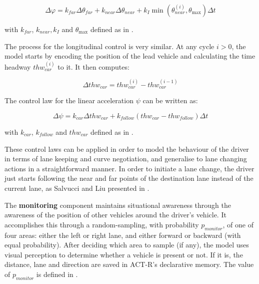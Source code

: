 \begin{equation}
	\Delta \varphi = k_{far} \Delta \theta_{far} + k_{near} \Delta \theta_{near} + k_I \min{(\theta_{near}^{(i)}, \theta_{\max})} \Delta t
\end{equation}

with $k_{far}$, $k_{near},k_{I}$ and $\theta_{\max}$ defined as in \cite{salvucci_1}.

The process for the longitudinal control is very similar. At any cycle $i > 0$, the model starts by encoding the position of the lead vehicle and calculating the time headway $thw_{car}^{(i)}$ to it. It then computes:

\begin{equation}
	\Delta thw_{car} = thw_{car}^{(i)} - thw_{car}^{(i-1)}
\end{equation}

The control law for the linear acceleration $\psi$ can be written as:

\begin{equation}
	\Delta \psi = k_{car} \Delta thw_{car} + k_{follow} (thw_{car} - thw_{follow})\Delta t
\end{equation}

with $k_{car}$, $k_{follow}$ and $thw_{car}$ defined as in \cite{salvucci_1}.

These control laws can be applied in order to model the behaviour of the driver in terms of lane keeping and curve negotiation, and generalise to lane changing actions in a straightforward manner. In order to initiate a lane change, the driver just starts following the near and far points of the destination lane instead of the current lane, as Salvucci and Liu presented in \cite{older_3}.

The \textbf{monitoring} component maintains situational awareness through the awareness of the position of other vehicles around the driver's vehicle. It accomplishes this through a random-sampling, with probability $p_{monitor}$, of one of four areas: either the left or right lane, and either forward or backward (with equal probability). After deciding which area to sample (if any), the model uses visual perception to determine whether a vehicle is present or not. If it is, the distance, lane and direction are saved in ACT-R's declarative memory. The value of $p_{monitor}$ is defined in \cite{salvucci_1}.

